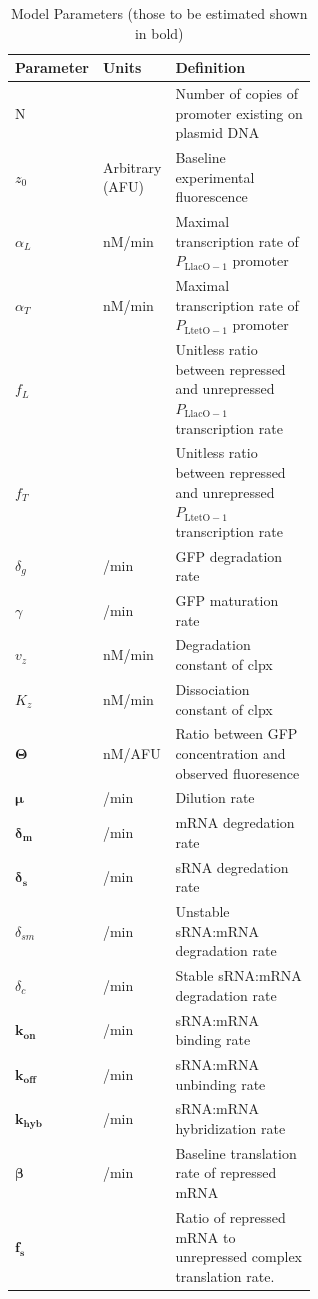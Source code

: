 \documentclass[10pt,journal]{./IEEE_latex_class/IEEEtran}
\begin{document}
\begin{table}[h]
\renewcommand{\arraystretch}{1.3}
\caption{Model Parameters (those to be estimated shown in bold)}
\label{ModelParameters}
\centering
\begin{tabular}{| l | l | p{0.6\linewidth} |}
\hline \textbf{Parameter} &  \textbf{Units} & \textbf{Definition}  \\
\hline \hline N & & Number of copies of promoter existing on plasmid DNA  \\
\hline $z_{0}$ &   Arbitrary (AFU) & Baseline experimental fluorescence  \\
\hline $\alpha_{L}$ & nM/min & Maximal transcription rate of $P_\mathrm{LlacO-1}$ promoter\\
\hline $\alpha_{T}$  &  nM/min  & Maximal transcription rate of $P_{\mathrm{LtetO-1}}$ promoter \\
\hline $f_{L}$ &  & Unitless ratio between repressed and unrepressed $P_\mathrm{LlacO-1}$ transcription rate   \\ 
\hline $f_{T}$ &  & Unitless ratio between repressed and unrepressed $P_{\mathrm{LtetO-1}}$ transcription rate  \\
\hline $\delta_{g}$  & /min  & GFP degradation rate  \\
\hline $\gamma$ &  /min & GFP maturation rate  \\
\hline $v_{z}$ & nM/min & Degradation constant of clpx  \\
\hline $K_{z}$   &   nM/min & Dissociation constant of clpx  \\
\hline $\boldsymbol{\Theta}$  &   nM/AFU & Ratio between GFP concentration and observed fluoresence  \\
\hline $\boldsymbol{\mu}$ &  /min & Dilution rate  \\
\hline $\boldsymbol{\delta_{m}}$ &  /min & mRNA degredation rate  \\
\hline $\boldsymbol{\delta_{s}}$ &  /min & sRNA degredation rate  \\
\hline $\delta_{sm}$ &  /min & Unstable sRNA:mRNA degradation rate  \\
\hline $\delta_{c}$ &  /min & Stable sRNA:mRNA degradation rate  \\
\hline $\boldsymbol{k_{on}}$ &   /min & sRNA:mRNA binding rate \\
\hline $\boldsymbol{k_{off}}$ &  /min & sRNA:mRNA unbinding rate \\
\hline $\boldsymbol{k_{hyb}}$ &  /min & sRNA:mRNA hybridization rate \\
\hline $\boldsymbol{\beta}$ &   /min & Baseline translation rate of repressed mRNA \\
\hline $\boldsymbol{f_{s}}$ & & Ratio of repressed mRNA to unrepressed complex translation rate. \\
\hline
\end{tabular}
\end{table}
\end{document}
